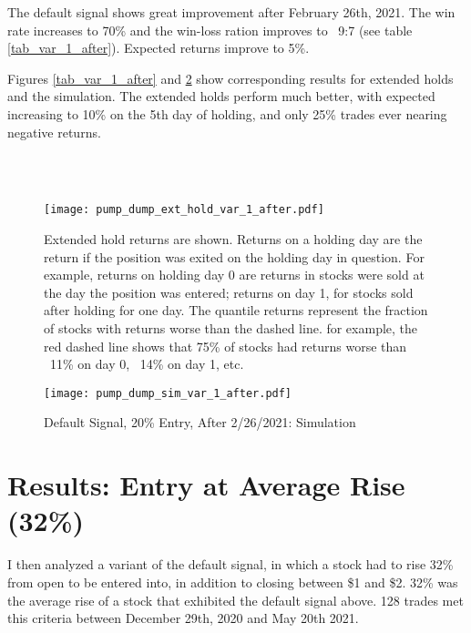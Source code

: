 \documentclass{article}
\begin{document}
The default signal shows great improvement after February 26th, 2021. The win rate increases to 70\% and the win-loss ration improves to ~9:7 (see table \ref{tab_var_1_after}). Expected returns improve to 5\%. 

Figures \ref{tab_var_1_after} and \ref{fig_var_1_sim_after} show corresponding results for extended holds and the simulation. The extended holds perform much better, with expected increasing to 10\% on the 5th day of holding, and only 25\% trades ever nearing negative returns. 

\begin{table}
\caption{Performance of Default Signal, Entry at 20\%, After 2/26/2021}
\\[2ex]


\\[2ex]

\label{tab_var_1_after}
\end{table}

\begin{figure}
\texttt{[image: pump\_dump\_ext\_hold\_var\_1\_after.pdf]}
\caption{Extended hold returns are shown. Returns on a holding day are the return if the position was exited on the holding day in question. For example, returns on holding day 0 are returns in stocks were sold at the day the position was entered; returns on day 1, for stocks sold after holding for one day. The quantile returns represent the fraction of stocks with returns worse than the dashed line. for example, the red dashed line shows that 75\% of stocks had returns worse than ~11\% on day 0, ~14\% on day 1, etc.}
\label{fig_var_1_ext_hold_after}
\end{figure}

\begin{figure}
\caption{Default Signal, 20\% Entry, After 2/26/2021: Simulation}
\center
\texttt{[image: pump\_dump\_sim\_var\_1\_after.pdf]}
\label{fig_var_1_sim_after}
\end{figure}

\pagebreak

\section{Results: Entry at Average Rise (32\%)}

I then analyzed a variant of the default signal, in which a stock had to rise 32\% from open to be entered into, in addition to closing between \$1 and \$2. 32\% was the average rise of a stock that exhibited the default signal above. 128 trades met this criteria between December 29th, 2020 and May 20th 2021.
\end{document}
